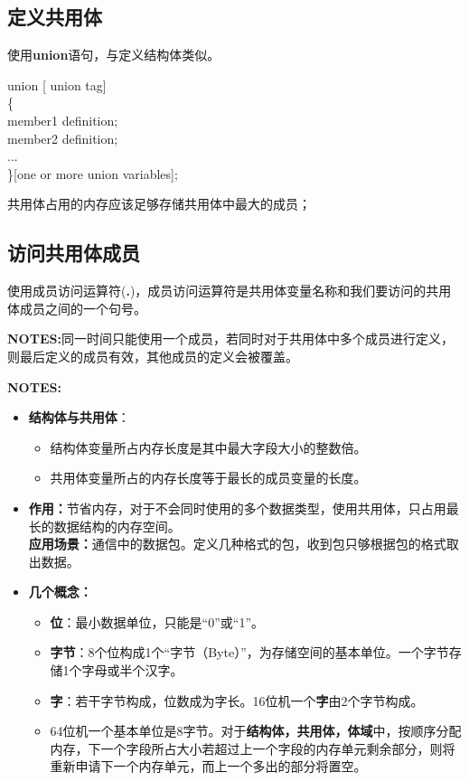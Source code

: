 \documentclass[UTF8]{ctexart}
\begin{document}
			\subsection{定义共用体}
			使用\textbf{union}语句，与定义结构体类似。
			\begin{framed}
				union [ union tag]\\
				\{\\
				member1 definition;\\
				member2 definition;\\
				...\\
				\}[one or more union variables];\\
			\end{framed}
			共用体占用的内存应该足够存储共用体中最大的成员；
			\subsection{访问共用体成员}
			使用成员访问运算符(\textbf{.})，成员访问运算符是共用体变量名称和我们要访问的共用体成员之间的一个句号。

			\textbf{NOTES:}同一时间只能使用一个成员，若同时对于共用体中多个成员进行定义，则最后定义的成员有效，其他成员的定义会被覆盖。
			\begin{framed}
				\textbf{NOTES:}
				\begin{itemize}
					\item \textbf{结构体与共用体}：\begin{itemize}
						\item 结构体变量所占内存长度是其中最大字段大小的整数倍。
						\item 共用体变量所占的内存长度等于最长的成员变量的长度。
					\end{itemize}
					\item \textbf{作用：}节省内存，对于不会同时使用的多个数据类型，使用共用体，只占用最长的数据结构的内存空间。\\ \textbf{应用场景：}通信中的数据包。定义几种格式的包，收到包只够根据包的格式取出数据。
					\item \textbf{几个概念：}\begin{itemize}
						\item \textbf{位}：最小数据单位，只能是“0”或“1”。
						\item \textbf{字节}：8个位构成1个“字节（Byte）”，为存储空间的基本单位。一个字节存储1个字母或半个汉字。
						\item \textbf{字}：若干字节构成，位数成为字长。16位机一个\textbf{字}由2个字节构成。
						\item 64位机一个基本单位是8字节。对于\textbf{结构体，共用体，体域}中，按顺序分配内存，下一个字段所占大小若超过上一个字段的内存单元剩余部分，则将重新申请下一个内存单元，而上一个多出的部分将置空。 
					\end{itemize}
				\end{itemize}
			\end{framed}
			
\end{document}
